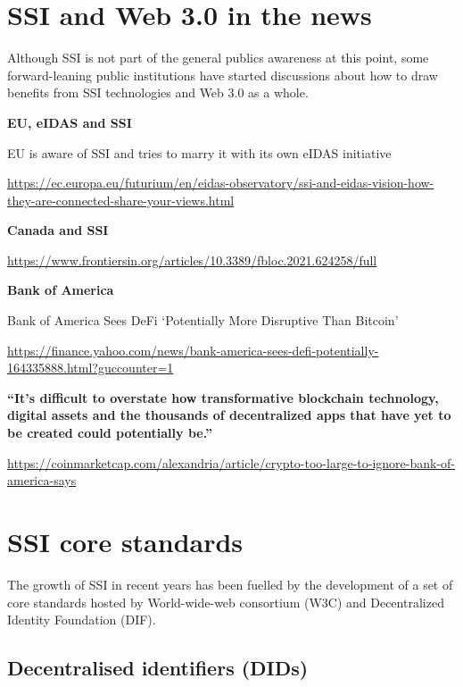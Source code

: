 \hypertarget{ssi-and-web-3.0-in-the-news}{%
\section{SSI and Web 3.0 in the
news}\label{ssi-and-web-3.0-in-the-news}}

Although SSI is not part of the general publics awareness at this point,
some forward-leaning public institutions have started discussions about
how to draw benefits from SSI technologies and Web 3.0 as a whole.

\textbf{EU, eIDAS and SSI}

EU is aware of SSI and tries to marry it with its own eIDAS initiative

\url{https://ec.europa.eu/futurium/en/eidas-observatory/ssi-and-eidas-vision-how-they-are-connected-share-your-views.html}

\textbf{Canada and SSI}

\url{https://www.frontiersin.org/articles/10.3389/fbloc.2021.624258/full}

\textbf{Bank of America}

Bank of America Sees DeFi `Potentially More Disruptive Than Bitcoin'

\url{https://finance.yahoo.com/news/bank-america-sees-defi-potentially-164335888.html?guccounter=1}

\textbf{``It's difficult to overstate how transformative blockchain
technology, digital assets and the thousands of decentralized apps that
have yet to be created could potentially be.''}

\url{https://coinmarketcap.com/alexandria/article/crypto-too-large-to-ignore-bank-of-america-says}

\hypertarget{ssi-core-standards}{%
\section{SSI core standards}\label{ssi-core-standards}}

The growth of SSI in recent years has been fuelled by the development of
a set of core standards hosted by World-wide-web consortium (W3C) and
Decentralized Identity Foundation (DIF).

\hypertarget{decentralised-identifiers-dids}{%
\subsection{Decentralised identifiers
(DIDs)}\label{decentralised-identifiers-dids}}

